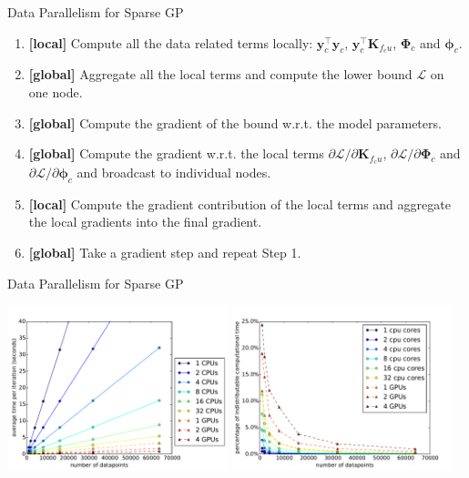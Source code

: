 \documentclass[14pt,aspectratio=1610]{beamer}
\newcommand{\yV}{\mathbf{y}}
\newcommand{\K}{\mathbf{K}}
\newcommand{\bound}{\mathcal{L}}
\newcommand{\phiM}{\mathbf{\Phi}}
\newcommand{\phiV}{\mathbf{\phi}}
\begin{document}
\begin{frame}{Data Parallelism for Sparse GP}
\begin{enumerate}
\item \textbf{[local]} Compute all the data related terms locally: $\yV_c^\top\yV_c$, $\yV_c^\top\K_{f_c u}$, $\phiM_c$ and $\phiV_c$.
\item \textbf{[global]} Aggregate all the local terms and compute the lower bound $\bound$ on one node.
\item \textbf{[global]} Compute the gradient of the bound w.r.t. the model parameters.
\item \textbf{[global]} Compute the gradient w.r.t. the local terms $\partial \bound/\partial \K_{f_c u}$, $\partial \bound/\partial \phiM_c$ and $\partial \bound/\partial \phiV_c$ and broadcast to individual nodes.
\item \textbf{[local]} Compute the gradient contribution of the local terms and aggregate the local gradients into the final gradient.
\item \textbf{[global]} Take a gradient step and repeat Step 1.
\end{enumerate}
\end{frame}

\begin{frame}{Data Parallelism for Sparse GP}
\begin{center}
\includegraphics[width=0.48\textwidth]{parallel_scaling.pdf} 
\hfill
\includegraphics[width=0.48\textwidth]{parallel_portion.pdf} 
\end{center}
\end{frame}
\end{document}
